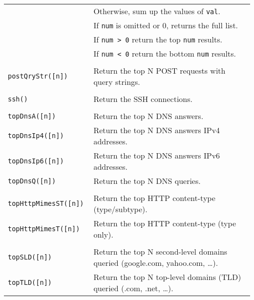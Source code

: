 \documentclass[documentation]{subfiles}
\begin{document}
\begin{longtable}{>{\tt}ll}
                             & Otherwise, sum up the values of {\tt val}.\\
                             & If {\tt num} is omitted or 0, returns the full list.\\
                             & If {\tt num > 0} return the top {\tt num} results.\\
                             & If {\tt num < 0} return the bottom {\tt num} results.\\
    \\
    postQryStr([n])          & Return the top N POST requests with query strings.\\
    \\
    ssh()                    & Return the SSH connections.\\
    \\
    topDnsA([n])             & Return the top N DNS answers.\\
    topDnsIp4([n])           & Return the top N DNS answers IPv4 addresses.\\
    topDnsIp6([n])           & Return the top N DNS answers IPv6 addresses.\\
    topDnsQ([n])             & Return the top N DNS queries.\\
    \\
    topHttpMimesST([n])      & Return the top HTTP content-type (type/subtype).\\
    topHttpMimesT([n])       & Return the top HTTP content-type (type only).\\
    \\
    topSLD([n])              & Return the top N second-level domains queried (google.com, yahoo.com, \ldots).\\
    topTLD([n])              & Return the top N top-level domains (TLD) queried (.com, .net, \ldots).\\
    \bottomrule
\end{longtable}
\end{document}
